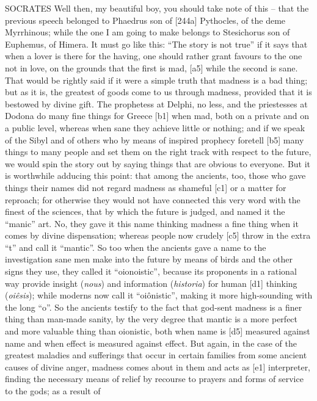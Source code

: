 SOCRATES Well then, my beautiful boy, you should take note of this --
that the previous speech belonged to Phaedrus son of {[}244a{]}
Pythocles, of the deme Myrrhinous; while the one I am going to make
belongs to Stesichorus son of Euphemus, of
Himera. It must go like
this: “The story is not true” if it says that when a lover is there for
the having, one should rather grant favours to the one not in love, on
the grounds that the first is mad, {[}a5{]} while the second is sane.
That would be rightly said if it were a simple truth that madness is a
bad thing; but as it is, the greatest of goods come to us through
madness, provided that it is bestowed by divine gift. The prophetess at
Delphi, no less, and the priestesses at Dodona do many fine things for
Greece {[}b1{]} when mad, both on a private and on a public level,
whereas when sane they achieve little or nothing; and if we speak of the
Sibyl and of others who by means of inspired prophecy foretell {[}b5{]}
many things to many people and set them on the right track with respect
to the future, we would spin the story out by saying things that are
obvious to everyone. But it is worthwhile adducing this point: that
among the ancients, too, those who gave things their names did not
regard madness as shameful {[}c1{]} or a matter for reproach; for
otherwise they would not have connected this very word with the finest
of the sciences, that by which the future is judged, and named it the
“manic” art. No, they gave it this name thinking madness a fine thing
when it comes by divine dispensation; whereas people now crudely
{[}c5{]} throw in the extra “t” and call it
“mantic”. So too when the
ancients gave a name to the investigation sane men make into the future
by means of birds and the other signs they use, they called it
“oionoistic”, because its proponents in a rational way provide insight
({\em nous}) and information ({\em historia}) for human {[}d1{]}
thinking ({\em oiêsis}); while moderns now call it “oiônistic”, making
it more high-sounding with the long “o”. So the ancients testify to the
fact that god-sent madness is a finer thing than man-made sanity, by the
very degree that mantic is a more perfect and more valuable thing than
oionistic, both when name is {[}d5{]} measured against name and when
effect is measured against effect. But again, in the case of the
greatest maladies and sufferings that occur in certain families from
some ancient causes of divine anger, madness comes about in them and
acts as {[}e1{]} interpreter, finding the necessary means of relief by
recourse to prayers and forms of service to the gods; as a result of
